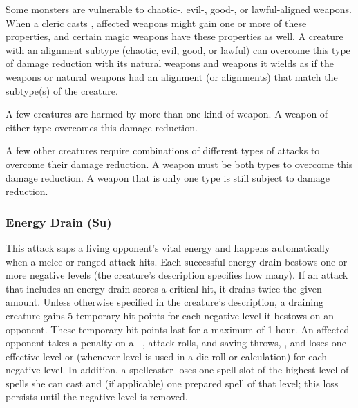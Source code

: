 Some monsters are vulnerable to chaotic-, evil-, good-, or lawful-aligned weapons. When a cleric casts , affected weapons might gain one or more of these properties, and certain magic weapons have these properties as well. A creature with an alignment subtype (chaotic, evil, good, or lawful) can overcome this type of damage reduction with its natural weapons and weapons it wields as if the weapons or natural weapons had an alignment (or alignments) that match the subtype(s) of the creature.

A few creatures are harmed by more than one kind of weapon. A weapon of either type overcomes this damage reduction.

A few other creatures require combinations of different types of attacks to overcome their damage reduction. A weapon must be both types to overcome this damage reduction. A weapon that is only one type is still subject to damage reduction.

\subsubsection{Energy Drain (Su)} This attack saps a living opponent's vital energy and happens automatically when a melee or ranged attack hits. Each successful energy drain bestows one or more negative levels (the creature's description specifies how many). If an attack that includes an energy drain scores a critical hit, it drains twice the given amount. Unless otherwise specified in the creature's description, a draining creature gains 5 temporary hit points for each negative level it bestows on an opponent. These temporary hit points last for a maximum of 1 hour. An affected opponent takes a  penalty on all , attack rolls, and saving throws, , and loses one effective level or  (whenever level is used in a die roll or calculation) for each negative level.  In addition, a spellcaster loses one spell slot of the highest level of spells she can cast and (if applicable) one prepared spell of that level; this loss persists until the negative level is removed. 

